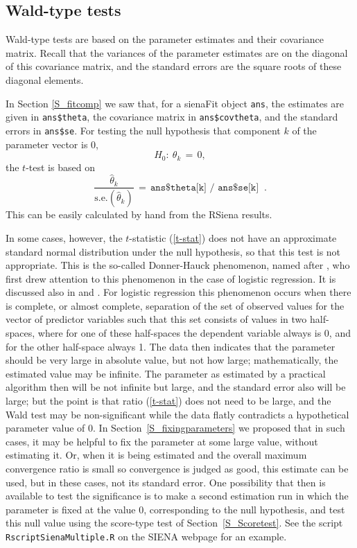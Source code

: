 \documentclass[a4paper,fleqn,11pt]{article}
\newcommand{\+}{\, + \,}
\newcommand{\se}{\mbox{s.e.}}
\newcommand{\RS}{{\sf RSiena }}
\newcommand{\SI}{{\sf SIENA }}
\begin{document}
\subsection{Wald-type tests}
\label{Waldtest}

Wald-type tests are based on the parameter estimates
and their covariance matrix.
Recall that the variances of the parameter estimates
are on the diagonal of this covariance matrix, and
the standard errors are the square roots of these diagonal
elements.

In Section \ref{S_fitcomp} we saw that, for a \textsf{sienaFit}
object \texttt{ans}, the estimates are given in
\texttt{ans\$theta}, the covariance matrix in \texttt{ans\$covtheta},
and the standard errors in \texttt{ans\$se}.
For testing the null hypothesis that component $k$ of the parameter
vector is 0,
\[
H_0 : \ \theta_k \,=\, 0 ,
\]
the $t$-test is based on
\begin{equation}
\frac{\hat\theta_k}{\se(\hat\theta_k)} \,=\,
   \texttt{ans\$theta[k] / ans\$se[k] } \ .  \label{t-stat}
\end{equation}
This can be easily calculated by hand from the \RS results.
\medskip

In some cases, however, the $t$-statistic (\ref{t-stat}) does not have
an approximate standard normal distribution under the null hypothesis,
so that this test is not appropriate.
This is the so-called Donner-Hauck phenomenon, named after
\citet{HauckDonner77}, who first drew attention to this phenomenon
in the case of logistic regression. It is discussed also in
\citet[section 1.6]{GeyerThompson92} and \citet{AlbertAnderson84}.
For logistic regression this phenomenon occurs when there is complete,
or almost complete, separation of the set of observed values
for the vector of predictor variables such that this set
consists of values in two half-spaces,
where for one of these half-spaces the
dependent variable always is 0, and for the other half-space always 1.
The data then indicates that the parameter
should be very large in absolute value, but not how large;
mathematically, the estimated value may be infinite.
The parameter as estimated by a practical algorithm
then will be not infinite but large, and the standard error
also will be large;
but the point is that ratio (\ref{t-stat}) does not need to be large,
and the Wald test may be non-significant while
the data flatly contradicts a hypothetical parameter value of 0.
In Section~\ref{S_fixingparameters} we proposed that in such cases,
it may be helpful to fix the parameter at some large value,
without estimating it.
Or, when it is being estimated and the
overall maximum convergence ratio is
small so convergence is judged as good, this estimate can be used,
but in these cases, not its standard error.
One possibility that then is available to test the significance
is to make a second estimation run in which the parameter is fixed at
the value 0, corresponding to the null hypothesis, and test
this null value using the score-type test of Section~\ref{S_Scoretest}.
See the script \texttt{RscriptSienaMultiple.R} on the \SI webpage
for an example.
\end{document}
